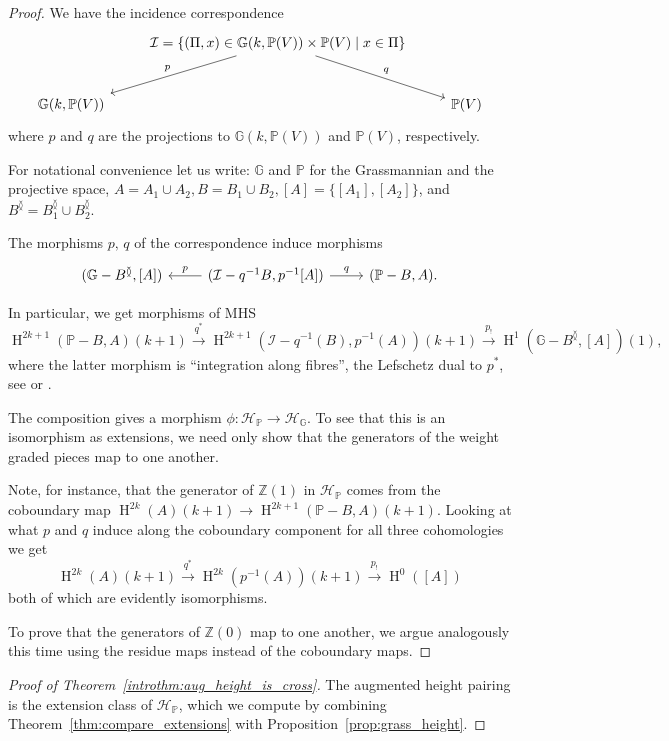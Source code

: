\documentclass[11pt,a4paper]{amsart}
\newcommand{\G}{\mathbb{G}}
\renewcommand{\H}{\operatorname{H}}
\newcommand{\Pp}{\mathbb{P}}
\newcommand{\pv}{\mathbb{P}(V)}
\newcommand{\Z}{\mathbb{Z}}
\theoremstyle{plain}
\theoremstyle{definition}
\theoremstyle{remark}
\newcommand{\ch}{\mathcal{H}}
\newcommand{\ci}{\mathcal{I}}
\newcommand{\too}{\longrightarrow}
\begin{document}
\begin{proof}
We have the incidence correspondence
\[
\begin{tikzcd}[row sep=large]
& \ci = \{(\Pi, x) \in \G(k,\pv) \times \pv \mid x \in \Pi\}
\arrow[dl,"p"'] \arrow[dr,"q"] & \\
\G(k,\pv) & & \pv
\end{tikzcd}
\]
where $p$ and $q$ are the projections to $\G(k,\pv)$ and $\pv$, respectively.

For notational convenience let us write: $\G$ and $\Pp$ for the Grassmannian and the projective space, $A = A_1 \cup A_2, B= B_1 \cup B_2, [A]=\{[A_1],[A_2]\}$, and $B^\between = B^\between_1 \cup B^\between_2$. 

The morphisms $p,\, q$ of the correspondence induce morphisms 
\[\begin{tikzcd}
	{(\G - B^\between,[A])}  & {(\mathcal{I} - q^{-1}B,p^{-1}[A])} &  {(\Pp - B,A)}.
	\arrow["p"', from=1-2, to=1-1]
	\arrow["q", from=1-2, to=1-3]
\end{tikzcd}\]

    In particular, we get morphisms of MHS 
    \[
    \H^{2k+1}(\Pp - B, A )(k+1) \overset{q^*}{\too} \H^{2k+1}(\ci - q^{-1}(B),p^{-1}(A))(k+1) \overset{p_!}{\too} \H^1(\G - B^\between, [A])(1),
    \]
    where the latter morphism is ``integration along fibres'', the Lefschetz dual to $p^*$, see \cite[p.8]{Steenbrink1999} or \cite[Theorem 4.1]{deCataldoMigliorini2004}.

    The composition gives a morphism $\phi \colon \ch_\Pp \to \ch_\G$. To see that this is an isomorphism as extensions, we need only show that the generators of the weight graded pieces map to one another.

    Note, for instance, that the generator of $\Z(1)$ in $\ch_\Pp$ comes from the coboundary map $\H^{2k}(A)(k+1) \to \H^{2k+1}(\Pp - B, A )(k+1)$. Looking at what $p$ and $q$ induce along the coboundary component for all three cohomologies we get
    \[
    \H^{2k}(A)(k+1) \overset{q^*}{\too} \H^{2k}(p^{-1}(A))(k+1) \overset{p_!}{\too} \H^0([A])
    \]
    both of which are evidently isomorphisms. 
    
    To prove that the generators of $\Z(0)$ map to one another, we argue analogously this time using the residue maps instead of the coboundary maps.
\end{proof}

\begin{proof}[Proof of Theorem~\ref{introthm:aug_height_is_cross}]
    The augmented height pairing is the extension class of $\ch_\Pp$, which we compute by combining Theorem~\ref{thm:compare_extensions} with Proposition~\ref{prop:grass_height}.
\end{proof}
\end{document}
